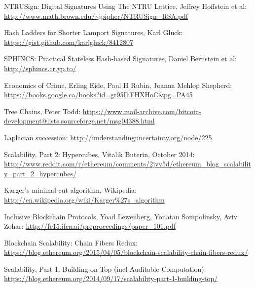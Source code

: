 \documentclass[11pt,a4paper]{article}
\theoremstyle{plain}
\theoremstyle{definition}
\theoremstyle{remark}
\begin{document}
\begin{thebibliography}{39}
    NTRUSign: Digital Signatures Using The NTRU Lattice, Jeffrey Hoffstein et al: \url{http://www.math.brown.edu/~jpipher/NTRUSign_RSA.pdf}

    Hash Ladders for Shorter Lamport Signatures, Karl Gluck: \url{https://gist.github.com/karlgluck/8412807}

    SPHINCS: Practical Stateless Hash-based Signatures, Daniel Bernstein et al: \url{http://sphincs.cr.yp.to/}

    Economics of Crime, Erling Eide, Paul H Rubin, Joanna Mehlop Shepherd: \url{https://books.google.ca/books?id=gr95IhFHXHoC&pg=PA45}

    Tree Chains, Peter Todd: \url{https://www.mail-archive.com/bitcoin-development@lists.sourceforge.net/msg04388.html}

    Laplacian succession: \url{http://understandinguncertainty.org/node/225}

    Scalability, Part 2: Hypercubes, Vitalik Buterin, October 2014: \url{http://www.reddit.com/r/ethereum/comments/2jvv5d/ethereum_blog_scalability_part_2_hypercubes/}

    Karger's minimal-cut algorithm, Wikipedia: \url{http://en.wikipedia.org/wiki/Karger%27s_algorithm}

    Inclusive Blockchain Protocols, Yoad Lewenberg, Yonatan Sompolinsky, Aviv Zohar: \url{http://fc15.ifca.ai/preproceedings/paper_101.pdf}

    Blockchain Scalability: Chain Fibers Redux: \url{https://blog.ethereum.org/2015/04/05/blockchain-scalability-chain-fibers-redux/}

    Scalability, Part 1: Building on Top (incl Auditable Computation): \url{https://blog.ethereum.org/2014/09/17/scalability-part-1-building-top/}

\end{thebibliography}
\end{document}
